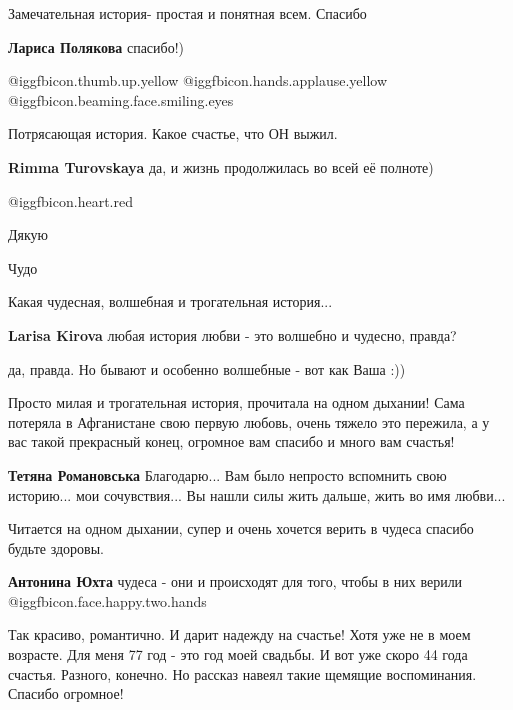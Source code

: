 \begin{itemize}
Замечательная история- простая и понятная всем. Спасибо

\textbf{Лариса Полякова} спасибо!)

 @igg{fbicon.thumb.up.yellow}  @igg{fbicon.hands.applause.yellow}  @igg{fbicon.beaming.face.smiling.eyes} 

Потрясающая история. Какое счастье, что ОН выжил.

\begin{itemize} %
\textbf{Rimma Turovskaya} да, и жизнь продолжилась во всей её полноте)
\end{itemize} %

@igg{fbicon.heart.red}

Дякую

Чудо

Какая чудесная, волшебная и трогательная история...

\begin{itemize} %
\textbf{Larisa Kirova} любая история любви - это волшебно и чудесно, правда?

да, правда. Но бывают и особенно волшебные - вот как Ваша :))
\end{itemize} %


Просто милая и трогательная история, прочитала на одном дыхании! Сама потеряла
в Афганистане свою первую любовь, очень тяжело это пережила, а у вас такой
прекрасный конец, огромное вам спасибо и много вам счастья!

\begin{itemize} %
\textbf{Тетяна Романовська} 
Благодарю... Вам было непросто вспомнить свою историю... мои сочувствия... Вы нашли силы жить дальше, жить во имя любви...
\end{itemize} %

Читается на одном дыхании, супер и очень хочется верить в чудеса спасибо будьте здоровы.

\textbf{Антонина Юхта} чудеса - они и происходят для того, чтобы в них верили @igg{fbicon.face.happy.two.hands} 


Так красиво, романтично. И дарит надежду на счастье! Хотя уже не в моем
возрасте. Для меня 77 год - это год моей свадьбы. И вот уже скоро 44 года
счастья. Разного, конечно. Но рассказ навеял такие щемящие воспоминания.
Спасибо огромное!


\end{itemize}
